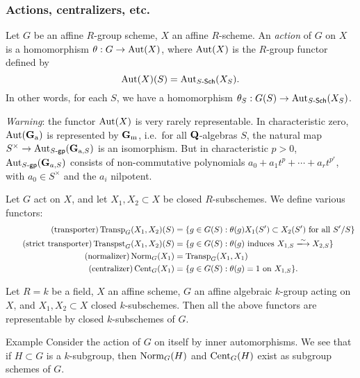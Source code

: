 \subsubsection{Actions, centralizers, etc.}

Let $G$ be an affine $R$-group scheme, $X$ an affine $R$-scheme. An 
\emph{action} of $G$ on $X$ is a homomorphism 
$\theta:G\to \operatorname{Aut}(X)$, where $\operatorname{Aut}(X)$ is the $R$-group 
functor defined by 
\[
  \operatorname{Aut}(X)(S) = \operatorname{Aut}_{S\textnormal{-}\mathsf{Sch}}(X_S) .
\]
In other words, for each $S$, we have a homomorphism 
$\theta_S:G(S) \to \operatorname{Aut}_{S\textnormal{-}\mathsf{Sch}}(X_S)$. 

\emph{Warning}: the functor $\operatorname{Aut}(X)$ is very rarely representable. 
In characteristic zero, $\operatorname{Aut}(\mathbf{G}_{\mathrm{a}})$ is represented by 
$\mathbf{G}_{\mathrm{m}}$, i.e.\ for all $\mathbf{Q}$-algebras $S$, the natural map 
$S^\times \to \operatorname{Aut}_{S\textnormal{-}\mathsf{gp}}(\mathbf{G}_{\mathrm{a},S})$ is 
an isomorphism. But in characteristic $p>0$, 
$\operatorname{Aut}_{S\textnormal{-}\mathsf{gp}}(\mathbf{G}_{a,S})$ consists of 
non-commutative polynomials $a_0+a_1 t^p + \cdots + a_r t^{p^r}$, with 
$a_0\in S^\times$ and the $a_i$ nilpotent. 

Let $G$ act on $X$, and let $X_1,X_2\subset X$ be closed $R$-subschemes. We 
define various functors: 
\begin{align*}\tag{transporter}
  \transporter_G(X_1,X_2)(S) &= \{g\in G(S):\theta(g)X_1(S')\subset X_2(S')\text{ for all }S'/S\} \\  \tag{strict transporter}
  \stricttransporter_G(X_1,X_2)(S) &= \{g\in G(S):\theta(g)\text{ induces }X_{1,S}\isomorphism X_{2,S}\} \\ \tag{normalizer}
  \normalizer_G(X_1) &= \transporter_G(X_1,X_1) \\ \tag{centralizer} 
  \centralizer_G(X_1) &= \{g\in G(S):\theta(g) = 1\text{ on }X_{1,S}\} .
\end{align*}

\begin{theo}[Grothendieck]
Let $R=k$ be a field, $X$ an affine scheme, $G$ an affine algebraic $k$-group 
acting on $X$, and $X_1,X_2\subset X$ closed $k$-subschemes. Then all the above 
functors are representable by closed $k$-subschemes of $G$. 
\end{theo}

\begin{enonce}[remark]{Example}
Consider the action of $G$ on itself by inner automorphisms. We see that if 
$H\subset G$ is a $k$-subgroup, then 
$\operatorname{Norm}_G(H)$ and $\operatorname{Cent}_G(H)$ exist as subgroup schemes of $G$. 
\end{enonce}

